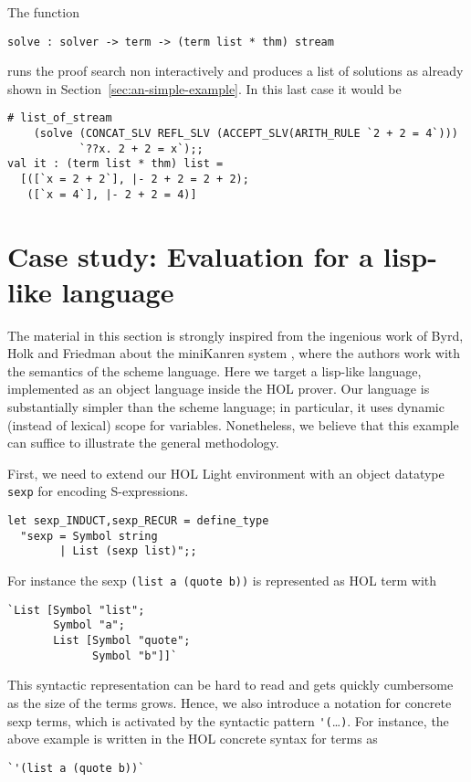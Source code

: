 The function
\begin{verbatim}
solve : solver -> term -> (term list * thm) stream
\end{verbatim}
runs the proof search non interactively and produces a list of
solutions as already shown in Section~\ref{sec:an-simple-example}.  In
this last case it would be
\begin{verbatim}
# list_of_stream
    (solve (CONCAT_SLV REFL_SLV (ACCEPT_SLV(ARITH_RULE `2 + 2 = 4`)))
           `??x. 2 + 2 = x`);;
val it : (term list * thm) list =
  [([`x = 2 + 2`], |- 2 + 2 = 2 + 2);
   ([`x = 4`], |- 2 + 2 = 4)]
\end{verbatim}



\section{Case study: Evaluation for a lisp-like language}
\label{sec:lisp-eval}

The material in this section is strongly inspired from the ingenious
work of Byrd, Holk and Friedman about the miniKanren system
\citep{Byrd:2012:MLU:2661103.2661105}, where the authors work with the
semantics of the scheme language.  Here we target a lisp-like
language, implemented as an object language inside the HOL prover.
Our language is substantially simpler than the scheme language; in
particular, it uses dynamic (instead of lexical) scope for variables.
Nonetheless, we believe that this example can suffice to illustrate
the general methodology.

First, we need to extend our HOL Light environment with an object
datatype \verb|sexp| for encoding S-expressions.
\begin{verbatim}
let sexp_INDUCT,sexp_RECUR = define_type
  "sexp = Symbol string
        | List (sexp list)";;
\end{verbatim}
For instance the sexp \verb|(list a (quote b))| is represented as HOL
term with
\begin{verbatim}
`List [Symbol "list";
       Symbol "a";
       List [Symbol "quote";
             Symbol "b"]]`
\end{verbatim}
This syntactic representation can be hard to read and gets quickly
cumbersome as the size of the terms grows.  Hence, we also introduce a
notation for concrete sexp terms, which is activated by the syntactic
pattern \verb|'(|\ldots\verb|)|.  For instance, the above example
is written in the HOL concrete syntax for terms as
\begin{verbatim}
`'(list a (quote b))`
\end{verbatim}

